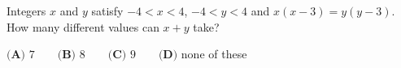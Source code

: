 Integers $x$ and $y$ satisfy $-4<x<4$, $-4<y<4$ and $x(x-3)=y(y-3)$. How many different values can $x+y$ take?

$\textbf{(A) }7\qquad\textbf{(B) }8\qquad\textbf{(C) }9\qquad\textbf{(D)}$ none of these
